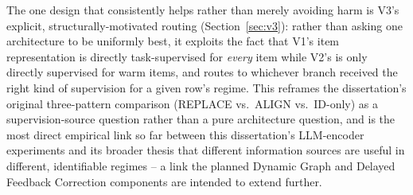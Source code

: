 The one design that consistently helps rather than merely avoiding harm is V3's explicit, structurally-motivated routing (Section~\ref{sec:v3}): rather than asking one architecture to be uniformly best, it exploits the fact that V1's item representation is directly task-supervised for \emph{every} item while V2's is only directly supervised for warm items, and routes to whichever branch received the right kind of supervision for a given row's regime. This reframes the dissertation's original three-pattern comparison (REPLACE vs.\ ALIGN vs.\ ID-only) as a supervision-source question rather than a pure architecture question, and is the most direct empirical link so far between this dissertation's LLM-encoder experiments and its broader thesis that different information sources are useful in different, identifiable regimes -- a link the planned Dynamic Graph and Delayed Feedback Correction components are intended to extend further.
